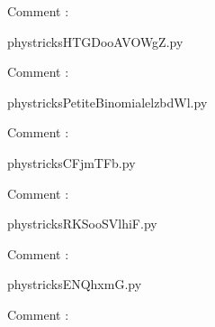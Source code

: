     Comment : 

    \clearpage
    


    \newcommand{\CaptionFigHTGDooAVOWgZ}{<+Type your caption here+>}
    \begin{center}
        
    \end{center}
    phystricksHTGDooAVOWgZ.py

    Comment : 

    \clearpage
    


    \newcommand{\CaptionFigPetiteBinomialelzbdWl}{<+Type your caption here+>}
    \begin{center}
        
    \end{center}
    phystricksPetiteBinomialelzbdWl.py

    Comment : 

    \clearpage
    


    \newcommand{\CaptionFigCFjmTFb}{<+Type your caption here+>}
    \begin{center}
        
    \end{center}
    phystricksCFjmTFb.py

    Comment : 

    \clearpage
    


    \newcommand{\CaptionFigRKSooSVlhiF}{<+Type your caption here+>}
    \begin{center}
        
    \end{center}
    phystricksRKSooSVlhiF.py

    Comment : 

    \clearpage
    


    \newcommand{\CaptionFigENQhxmG}{<+Type your caption here+>}
    \begin{center}
        
    \end{center}
    phystricksENQhxmG.py

    Comment : 

    \clearpage
    

